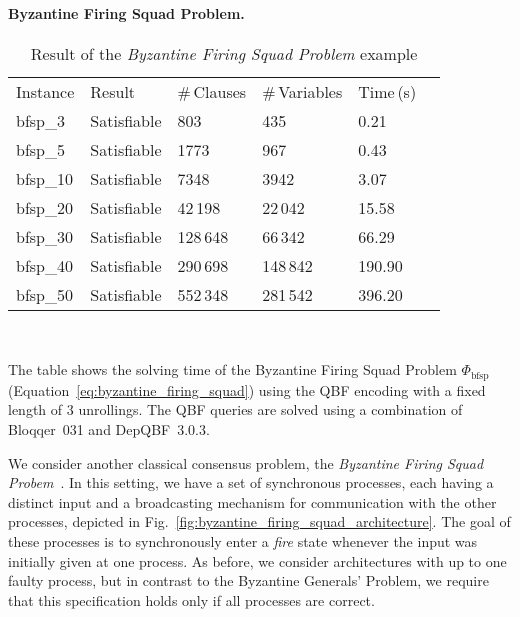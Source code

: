 \documentclass{LMCS}
\theoremstyle{plain}\newtheorem{theorem}[thm]{Theorem}
\theoremstyle{plain}\newtheorem{lemma}[thm]{Lemma}
\theoremstyle{plain}\newtheorem{proposition}[thm]{Proposition}
\theoremstyle{plain}\newtheorem{corollary}[thm]{Corollary}
\theoremstyle{definition}\newtheorem{definition}{Definition}[section]
\begin{document}
\paragraph{\bf Byzantine Firing Squad Problem.}
\begin{table}[h]
\caption[]{Result of the \emph{Byzantine Firing Squad Problem} example}
\label{tbl:bfsp}
\centering
\begin{tabular}{llllll}
\hline\noalign{\smallskip}
Instance\hspace{10pt} & Result\hspace{40pt} & \#\,Clauses\hspace{10pt} & \#\,Variables\hspace{10pt} & Time\,(s) \\ \noalign{\smallskip}
\hline
\noalign{\smallskip}
bfsp\_3  & Satisfiable & 803      & 435      & 0.21 \\
bfsp\_5  & Satisfiable & 1773     & 967      & 0.43 \\
bfsp\_10 & Satisfiable & 7348     & 3942     & 3.07 \\
bfsp\_20 & Satisfiable & 42\,198  & 22\,042  & 15.58 \\
bfsp\_30 & Satisfiable & 128\,648 & 66\,342  & 66.29 \\
bfsp\_40 & Satisfiable & 290\,698 & 148\,842 & 190.90 \\
bfsp\_50 & Satisfiable & 552\,348 & 281\,542 & 396.20 \\ \hline
\end{tabular}\\ {\smallskip}
\begin{minipage}[t]{0.74\textwidth}
{\small The table shows the solving time of the Byzantine Firing Squad Problem $\Phi_\text{bfsp}$ (Equation~\ref{eq:byzantine_firing_squad}) using the QBF encoding with a fixed length of $3$ unrollings.
The QBF queries are solved using a combination of Bloqqer~031 and DepQBF~3.0.3.}
\end{minipage}
\end{table}
We consider another classical consensus problem, the \emph{Byzantine Firing Squad Probem}~\cite{DBLP:conf/podc/FischerLM85}.
In this setting, we have a set of synchronous processes, each having a distinct input and a broadcasting mechanism for communication with the other processes, depicted in Fig.~\ref{fig:byzantine_firing_squad_architecture}.
The goal of these processes is to synchronously enter a \emph{fire} state whenever the input was initially given at one process.
As before, we consider architectures with up to one faulty process, but in contrast to the Byzantine Generals' Problem, we require that this specification holds only if all processes are correct.
\end{document}
